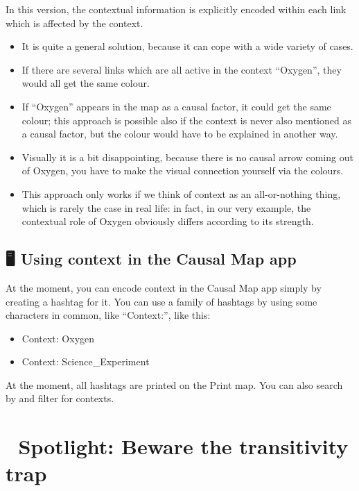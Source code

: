 \documentclass[
]{book}
\begin{document}
In this version, the contextual information is explicitly encoded within each link which is affected by the context.

\begin{itemize}
\item
  It is quite a general solution, because it can cope with a wide variety of cases.
\item
  If there are several links which are all active in the context ``Oxygen'', they would all get the same colour.
\item
  If ``Oxygen'' appears in the map as a causal factor, it could get the same colour; this approach is possible also if the context is never also mentioned as a causal factor, but the colour would have to be explained in another way.
\item
  Visually it is a bit disappointing, because there is no causal arrow coming out of Oxygen, you have to make the visual connection yourself via the colours.
\item
  This approach only works if we think of context as an all-or-nothing thing, which is rarely the case in real life: in fact, in our very example, the contextual role of Oxygen obviously differs according to its strength.
\end{itemize}

\hypertarget{using-context-in-the-causal-map-app}{%
\section{🖥 Using context in the Causal Map app}\label{using-context-in-the-causal-map-app}}

At the moment, you can encode context in the Causal Map app simply by creating a hashtag for it. You can use a family of hashtags by using some characters in common, like ``Context:'', like this:

\begin{itemize}
\item
  Context: Oxygen
\item
  Context: Science\_Experiment
\end{itemize}

At the moment, all hashtags are printed on the Print map. You can also search by and filter for contexts.

\hypertarget{spotlight-beware-the-transitivity-trap}{%
\chapter{🧠 Spotlight: Beware the transitivity trap}\label{spotlight-beware-the-transitivity-trap}}
\end{document}
